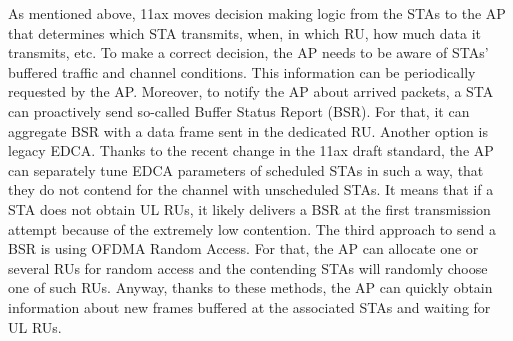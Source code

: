 As mentioned above, 11ax moves decision making logic from the STAs to the AP that determines which STA transmits, when, in which RU, how much data it transmits, etc.
To make a correct decision, the AP needs to be aware of STAs' buffered traffic and channel conditions.
This information can be periodically requested by the AP.
Moreover, to notify the AP about arrived packets, a STA can proactively send so-called Buffer Status Report (BSR).
For that, it can aggregate BSR with a data frame sent in the dedicated RU.
Another option is legacy EDCA.
Thanks to the recent change in the 11ax draft standard, the AP can separately tune EDCA parameters of scheduled STAs in such a way, that they do not contend for the channel with unscheduled STAs.
It means that if a STA does not obtain UL RUs, it likely delivers a BSR at the first transmission attempt because of the extremely low contention.
The third approach to send a BSR is using OFDMA Random Access.
For that, the AP can allocate one or several RUs for random access and the contending STAs will randomly choose one of such RUs. 
Anyway, thanks to these methods, the AP can quickly obtain information about new frames buffered  at the associated STAs and waiting for UL RUs.

